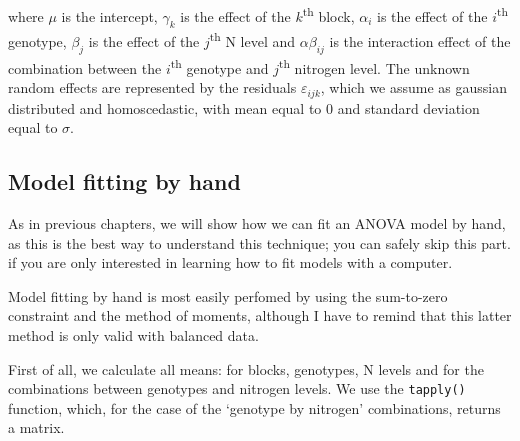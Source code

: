 \documentclass[a4paper,12pt,oneside]{book}
\begin{document}
where \(\mu\) is the intercept, \(\gamma_k\) is the effect of the \(k\)\textsuperscript{th} block, \(\alpha_i\) is the effect of the \(i\)\textsuperscript{th} genotype, \(\beta_j\) is the effect of the \(j\)\textsuperscript{th} N level and \(\alpha\beta_{ij}\) is the interaction effect of the combination between the \(i\)\textsuperscript{th} genotype and \(j\)\textsuperscript{th} nitrogen level. The unknown random effects are represented by the residuals \(\varepsilon_{ijk}\), which we assume as gaussian distributed and homoscedastic, with mean equal to 0 and standard deviation equal to \(\sigma\).

\hypertarget{model-fitting-by-hand-1}{%
\subsection{Model fitting by hand}\label{model-fitting-by-hand-1}}

As in previous chapters, we will show how we can fit an ANOVA model by hand, as this is the best way to understand this technique; you can safely skip this part. if you are only interested in learning how to fit models with a computer.

Model fitting by hand is most easily perfomed by using the sum-to-zero constraint and the method of moments, although I have to remind that this latter method is only valid with balanced data.

First of all, we calculate all means: for blocks, genotypes, N levels and for the combinations between genotypes and nitrogen levels. We use the \texttt{tapply()} function, which, for the case of the `genotype by nitrogen' combinations, returns a matrix.

\vspace{12pt}
\end{document}
